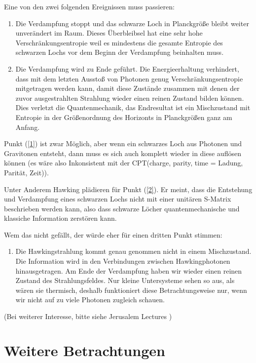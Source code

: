 \documentclass[ngerman]{scrartcl}
\begin{document}
Eine von den zwei folgenden Ereignissen muss passieren:
	\begin{enumerate}[(1)]
		\item Die Verdampfung stoppt und das schwarze Loch in Planckgröße bleibt weiter unverändert im Raum. Dieses Überbleibsel hat eine sehr hohe Verschränkungsentropie weil es mindestens die gesamte Entropie des schwarzen Lochs vor dem Beginn der Verdampfung beinhalten muss. \label{1}
		
		\item Die Verdampfung wird zu Ende geführt. Die Energieerhaltung verhindert, dass mit dem letzten Ausstoß von Photonen genug Verschränkungsentropie mitgetragen werden kann, damit diese Zustände zusammen mit denen der zuvor ausgestrahlten Strahlung wieder einen reinen Zustand bilden können. Dies verletzt die Quantenmechanik, das Endresultat ist ein Mischzustand mit Entropie in der Größenordnung des Horizonts in Planckgrößen ganz am Anfang.  \label{2}
	\end{enumerate}
Punkt (\ref{1}) ist zwar Möglich, aber wenn ein schwarzes Loch aus Photonen und Gravitonen entsteht, dann muss es sich auch komplett wieder in diese auflösen können (es wäre also Inkonsistent mit der CPT(charge, parity, time = Ladung, Parität, Zeit)).

Unter Anderem Hawking plädieren für Punkt (\ref{2}). Er meint, dass die Entstehung und Verdampfung eines schwarzen Lochs nicht mit einer unitären S-Matrix beschrieben werden kann, also dass schwarze Löcher quantenmechanische und klassiche Information zerstören kann. 

Wem das nicht gefällt, der würde eher für einen dritten Punkt stimmen:
	\begin{enumerate}[(3)]
		\item Die Hawkingstrahlung kommt genau genommen nicht in einem Mischzustand. Die Information wird in den Verbindungen zwischen Hawkingphotonen hinausgetragen. Am Ende der Verdampfung haben wir wieder einen reinen Zustand des Strahlungsfeldes. Nur kleine Untersysteme sehen so aus, als wären sie thermisch, deshalb funktioniert diese Betrachtungsweise nur, wenn wir nicht auf zu viele Photonen zugleich schauen. 
	\end{enumerate}   
(Bei weiterer Interesse, bitte siehe Jerusalem Lectures \cite{JerusalemsLectures})
	
\section{Weitere Betrachtungen}
\end{document}

